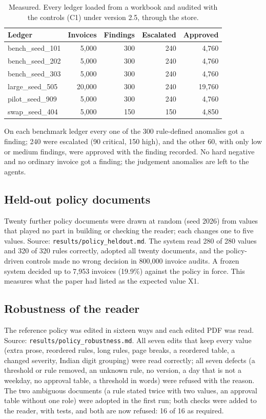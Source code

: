 \documentclass[11pt,a4paper]{article}
\begin{document}
\begin{table}[htbp]
\caption{Measured. Every ledger loaded from a workbook and audited with the controls (C1) under version 2.5, through the store.}
\label{tab:ledgerruns}
\centering
\small
\begin{tabular}{L{4.0cm}rrrr}
\toprule
Ledger & Invoices & Findings & Escalated & Approved \\
\midrule
bench\_seed\_101 & 5,000 & 300 & 240 & 4,760 \\
bench\_seed\_202 & 5,000 & 300 & 240 & 4,760 \\
bench\_seed\_303 & 5,000 & 300 & 240 & 4,760 \\
large\_seed\_505 & 20,000 & 300 & 240 & 19,760 \\
pilot\_seed\_909 & 5,000 & 300 & 240 & 4,760 \\
swap\_seed\_404 & 5,000 & 150 & 150 & 4,850 \\
\bottomrule
\end{tabular}
\end{table}

On each benchmark ledger every one of the 300 rule-defined anomalies got a finding; 240 were escalated (90 critical, 150 high), and the other 60, with only low or medium findings, were approved with the finding recorded. No hard negative and no ordinary invoice got a finding; the judgement anomalies are left to the agents.

\subsection{Held-out policy documents}
Twenty further policy documents were drawn at random (seed 2026) from values that played no part in building or checking the reader; each changes one to five values. Source: \texttt{results/\allowbreak policy\_heldout.md}. The system read 280 of 280 values and 320 of 320 rules correctly, adopted all twenty documents, and the policy-driven controls made no wrong decision in 800,000 invoice audits. A frozen system decided up to 7,953 invoices (19.9\%) against the policy in force. This measures what the paper had listed as the expected value X1.

\subsection{Robustness of the reader}
The reference policy was edited in sixteen ways and each edited PDF was read. Source: \texttt{results/\allowbreak policy\_robustness.md}. All seven edits that keep every value (extra prose, reordered rules, long rules, page breaks, a reordered table, a changed severity, Indian digit grouping) were read correctly; all seven defects (a threshold or rule removed, an unknown rule, no version, a day that is not a weekday, no approval table, a threshold in words) were refused with the reason. The two ambiguous documents (a rule stated twice with two values, an approval table without one role) were adopted in the first run; both checks were added to the reader, with tests, and both are now refused: 16 of 16 as required.
\end{document}
